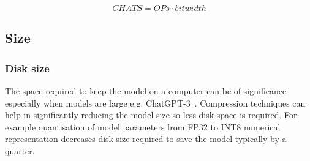  
%

\begin{equation}
    CHATS = OPs \cdot bit width
    \label{eq:CHATS}
\end{equation}

\subsection{Size}
\subsubsection{Disk size}
The space required to keep the model on a computer can be of significance especially when models are large e.g. ChatGPT-3~\cite{Brown2020}. Compression techniques can help in significantly reducing the model size so less disk space is required. For example quantisation of model parameters from FP32 to INT8 numerical representation decreases disk size required to save the model typically by a quarter. 
%




 

